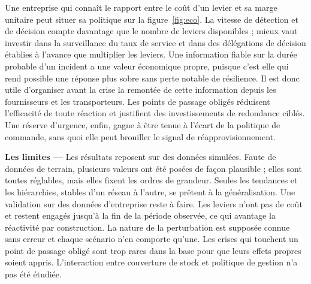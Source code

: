 Une entreprise qui connaît le rapport entre le coût d'un levier et sa marge unitaire peut situer sa politique sur la figure~\ref{fig:eco}. La vitesse de détection et de décision compte davantage que le nombre de leviers disponibles ; mieux vaut investir dans la surveillance du taux de service et dans des délégations de décision établies à l'avance que multiplier les leviers. Une information fiable sur la durée probable d'un incident a une valeur économique propre, puisque c'est elle qui rend possible une réponse plus sobre sans perte notable de résilience. Il est donc utile d'organiser avant la crise la remontée de cette information depuis les fournisseurs et les transporteurs. Les points de passage obligés réduisent l'efficacité de toute réaction et justifient des investissements de redondance ciblés. Une réserve d'urgence, enfin, gagne à être tenue à l'écart de la politique de commande, sans quoi elle peut brouiller le signal de réapprovisionnement.

\label{sec:5.3}

\textbf{Les limites — }Les résultats reposent sur des données simulées. Faute de données de terrain, plusieurs valeurs ont été posées de façon plausible ; elles sont toutes réglables, mais elles fixent les ordres de grandeur. Seules les tendances et les hiérarchies, stables d'un réseau à l'autre, se prêtent à la généralisation. Une validation sur des données d'entreprise reste à faire. Les leviers n'ont pas de coût et restent engagés jusqu'à la fin de la période observée, ce qui avantage la réactivité par construction. La nature de la perturbation est supposée connue sans erreur et chaque scénario n'en comporte qu'une. Les crises qui touchent un point de passage obligé sont trop rares dans la base pour que leurs effets propres soient appris. L'interaction entre couverture de stock et politique de gestion n'a pas été étudiée.
